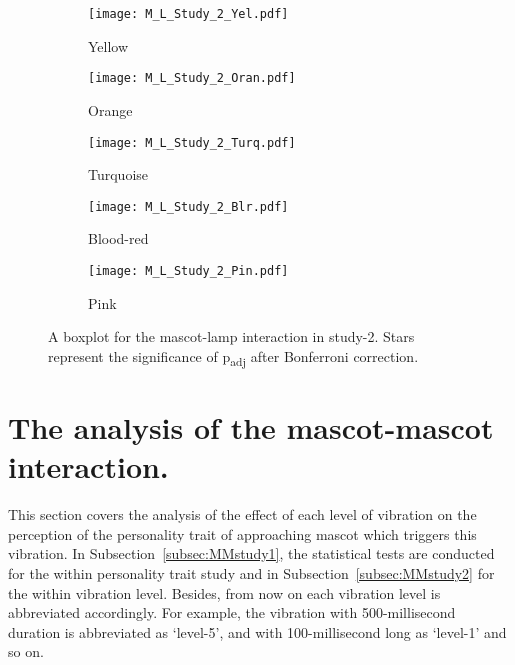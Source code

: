 \begin{figure}[hbt!]
    \centering
    \begin{subfigure}{.40\textwidth}
        \centering
        \texttt{[image: M\_L\_Study\_2\_Yel.pdf]}
        \caption{Yellow}
        \label{fig:sub1}
    \end{subfigure}\hfill%
    \begin{subfigure}{.40\textwidth}
        \centering
        \texttt{[image: M\_L\_Study\_2\_Oran.pdf]}
        \caption{Orange}
        \label{fig:sub2}
    \end{subfigure}\hfill
    \begin{subfigure}{.40\textwidth}
        \centering
        \texttt{[image: M\_L\_Study\_2\_Turq.pdf]}
        \caption{Turquoise}
        \label{fig:sub1}
    \end{subfigure}\hfill%
    \begin{subfigure}{.40\textwidth}
        \centering
        \texttt{[image: M\_L\_Study\_2\_Blr.pdf]}
        \caption{Blood-red}
        \label{fig:sub1}
    \end{subfigure}\hfill%
    \begin{subfigure}{.40\textwidth}
        \centering
        \texttt{[image: M\_L\_Study\_2\_Pin.pdf]}
        \caption{Pink}
        \label{fig:sub1}
    \end{subfigure}\hfill%
    \caption{A boxplot for the mascot-lamp interaction in study-2.
    Stars represent the significance of p\textsubscript{adj} after Bonferroni correction.}
    \label{fig:ML2}
\end{figure}
\section{The analysis of the mascot-mascot interaction.}
\label{sec:m-m}
This section covers the analysis of the effect of each level of vibration on the perception
of the personality trait of approaching mascot which triggers this vibration.
In Subsection~\ref{subsec:MMstudy1}, the statistical tests are conducted for the within
personality trait study and in Subsection~\ref{subsec:MMstudy2} for the within vibration level.
Besides, from now on each vibration level is abbreviated accordingly.
For example, the vibration with 500-millisecond duration is abbreviated
as ‘level-5’, and with 100-millisecond long as ‘level-1’ and so on.


